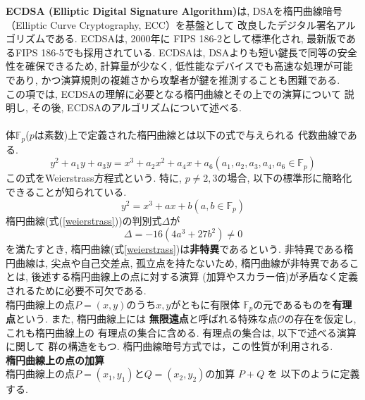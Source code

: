 \indent \textbf{ECDSA (Elliptic Digital Signature Algorithm)}は, 
DSA\cite{fips186-5}を楕円曲線暗号（Elliptic Curve Cryptography, ECC）を基盤として
改良したデジタル署名アルゴリズムである.
ECDSAは, 2000年に FIPS 186-2として標準化され, 
最新版であるFIPS 186-5\cite{fips186-5}でも採用されている.
ECDSAは, DSAよりも短い鍵長で同等の安全性を確保できるため, 
計算量が少なく, 低性能なデバイスでも高速な処理が可能であり, 
かつ演算規則の複雑さから攻撃者が鍵を推測することも困難である. \\
\indent この項では, ECDSAの理解に必要となる楕円曲線とその上での演算について
説明し, その後, ECDSAのアルゴリズムについて述べる.\\[1em]

\\
\indent 体$\mathbb{F}_p$($p$は素数)上で定義された楕円曲線とは以下の式で与えられる
代数曲線である.
\[
  y^2+a_1y+a_3y=x^3+a_2x^2+a_4x+a_6　　(a_1,a_2,a_3,a_4,a_6\in\mathbb{F}_p)
\]
この式をWeierstrass方程式という\cite{安田}. 
特に, $p\neq 2,3$の場合, 以下の標準形に簡略化できることが知られている. 
\begin{equation}\label{weierstrass}
  y^2=x^3+ax+b　　(a,b\in\mathbb{F}_p)
\end{equation}
\indent 楕円曲線(式(\ref{weierstrass}))の判別式$\Delta$が
\[
  \Delta=-16(4a^3+27b^2)\neq 0
\]
を満たすとき, 楕円曲線(式\ref{weierstrass})は\textbf{非特異}であるという. 
非特異である楕円曲線は, 尖点や自己交差点, 孤立点を持たないため, 
楕円曲線が非特異であることは, 後述する楕円曲線上の点に対する演算
(加算やスカラー倍)が矛盾なく定義されるために必要不可欠である.\\
\indent 楕円曲線上の点$P=(x,y)$のうち$x,y$がともに有限体
$\mathbb{F}_p$の元であるものを\textbf{有理点}という. また, 楕円曲線上には
\textbf{無限遠点}と呼ばれる特殊な点$\mathcal{O}$の存在を仮定し, これも楕円曲線上の
有理点の集合に含める. 有理点の集合は, 以下で述べる演算に関して
群の構造をもつ. 楕円曲線暗号方式では，この性質が利用される.\\[1em]
\noindent\textbf{楕円曲線上の点の加算}\\
\indent 楕円曲線上の点$P=(x_1,y_1)$と$Q=(x_2,y_2)$の加算 $P+Q$ を
以下のように定義する.
